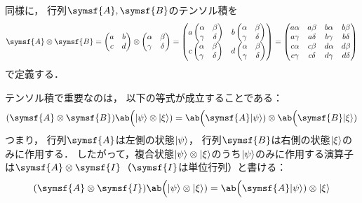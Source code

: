 \documentclass[
]{sotsu}
\begin{document}
同様に，
行列$\symsf{A}, \symsf{B}$のテンソル積を
\begin{equation}
    \label{eq:tensor-product-of-2-matrix}
    \symsf{A} \otimes \symsf{B}
    =
    \begin{pmatrix}
        a  & b  \\ c  & d 
    \end{pmatrix}
    \otimes 
    \begin{pmatrix}
        \alpha & \beta \\ \gamma & \delta
    \end{pmatrix}
    =
    \begin{pmatrix}
        a
        \begin{pmatrix}
            \alpha & \beta \\ \gamma & \delta
        \end{pmatrix}
        &
        b
        \begin{pmatrix}
            \alpha & \beta \\ \gamma & \delta
        \end{pmatrix}
        \\
        c
        \begin{pmatrix}
            \alpha & \beta \\ \gamma & \delta
        \end{pmatrix}
        &
        d
        \begin{pmatrix}
            \alpha & \beta \\ \gamma & \delta
        \end{pmatrix}
    \end{pmatrix}
    =
    \begin{pmatrix}
        a \alpha  &  a \beta   &  b \alpha  &  b \beta   \\
        a \gamma  &  a \delta  &  b \gamma  &  b \delta  \\
        c \alpha  &  c \beta   &  d \alpha  &  d \beta   \\
        c \gamma  &  c \delta  &  d \gamma  &  d \delta  
    \end{pmatrix}
\end{equation}
で定義する．

テンソル積で重要なのは，
以下の等式が成立することである：
\begin{equation}
    \label{eq:tensor-product-matrix-vector}
    (\symsf{A} \otimes \symsf{B}) \ab\Big(\ket{\psi} \otimes \ket{\xi})
    = \ab\Big(\symsf{A} \ket{\psi}) \otimes \ab\Big(\symsf{B} \ket{\xi})
\end{equation}
つまり，
行列$\symsf{A}$は左側の状態$\ket{\psi}$，
行列$\symsf{B}$は右側の状態$\ket{\xi}$のみに作用する．
したがって，複合状態$\ket{\psi} \otimes \ket{\xi}$のうち$\ket{\psi}$のみに作用する演算子は$\symsf{A} \otimes \symsf{I}$（$\symsf{I}$は単位行列）と書ける：
\begin{equation*}
    (\symsf{A} \otimes \symsf{I}) \ab\Big(\ket{\psi} \otimes \ket{\xi})
    = \ab\Big(\symsf{A} \ket{\psi}) \otimes \ket{\xi}
\end{equation*}
\end{document}
